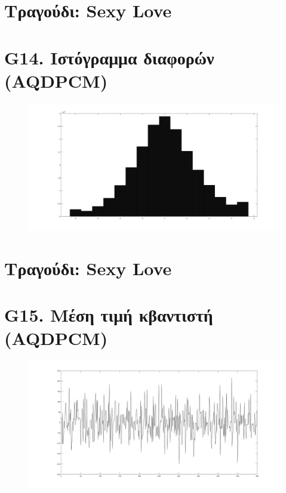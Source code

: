 \documentclass{article}
\begin{document}
\section*{Τραγούδι: Sexy Love}
\section*{G14. Ιστόγραμμα διαφορών (AQDPCM) }
\begin{figure}[h!]
 \begin{center}
 \advance\leftskip-6cm
  \includegraphics[width=230mm,scale=0.7]{g14s1.jpg}
\end{center}
\end{figure}
\newpage
\section*{Τραγούδι: Sexy Love}
\section*{G15. Μέση τιμή κβαντιστή (AQDPCM) }
\begin{figure}[h!]
 \begin{center}
 \advance\leftskip-6cm
  \includegraphics[width=230mm,scale=0.7]{g15s1.jpg}
\end{center}
\end{figure}
\newpage
\end{document}
